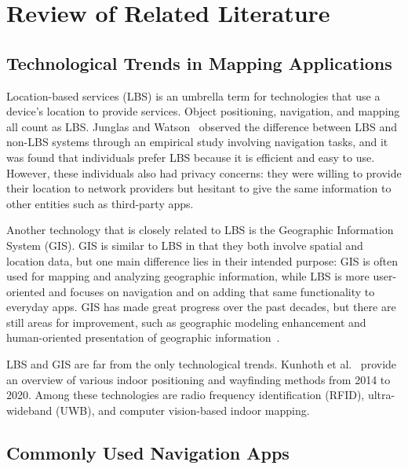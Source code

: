 \chapter[REVIEW OF RELATED LITERATURE]{Review of Related Literature}\label{ch:II}

\section{Technological Trends in Mapping Applications}\label{sec:2.1}

Location-based services (LBS) is an umbrella term for technologies that use a
device's location to provide services. Object positioning, navigation, and
mapping all count as LBS. Junglas and Watson~\cite{ref03} observed the
difference between LBS and non-LBS systems through an empirical study involving
navigation tasks, and it was found that individuals prefer LBS because it is
efficient and easy to use. However, these individuals also had privacy concerns:
they were willing to provide their location to network providers but hesitant to
give the same information to other entities such as third-party apps.

Another technology that is closely related to LBS is the Geographic Information
System (GIS). GIS is similar to LBS in that they both involve spatial and
location data, but one main difference lies in their intended purpose: GIS is
often used for mapping and analyzing geographic information, while LBS is more
user-oriented and focuses on navigation and on adding that same functionality to
everyday apps. GIS has made great progress over the past decades, but there are
still areas for improvement, such as geographic modeling enhancement and
human-oriented presentation of geographic information~\cite{ref04}.

LBS and GIS are far from the only technological trends. Kunhoth et
al.~\cite{ref05} provide an overview of various indoor positioning and
wayfinding methods from 2014 to 2020. Among these technologies are radio
frequency identification (RFID), ultra-wideband (UWB), and computer vision-based
indoor mapping.

\section{Commonly Used Navigation Apps}\label{sec:2.2}

